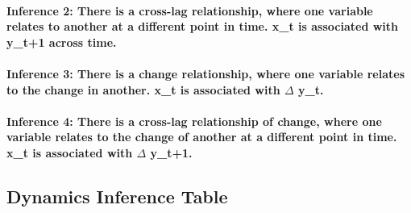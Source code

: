 \documentclass[english,,man]{apa6}
\let\oldparagraph\paragraph
\renewcommand{\paragraph}[1]{\oldparagraph{#1}\mbox{}}
\theoremstyle{definition}
\theoremstyle{definition}
\theoremstyle{definition}
\theoremstyle{remark}
\begin{document}
\hypertarget{inference-2-there-is-a-cross-lag-relationship-where-one-variable-relates-to-another-at-a-different-point-in-time.-x_t-is-associated-with-y_t1-across-time.}{%
\paragraph{Inference 2: There is a cross-lag relationship, where one
variable relates to another at a different point in time. x\_t is
associated with y\_t+1 across
time.}\label{inference-2-there-is-a-cross-lag-relationship-where-one-variable-relates-to-another-at-a-different-point-in-time.-x_t-is-associated-with-y_t1-across-time.}}

\hypertarget{inference-3-there-is-a-change-relationship-where-one-variable-relates-to-the-change-in-another.-x_t-is-associated-with-delta-y_t.}{%
\paragraph{\texorpdfstring{Inference 3: There is a change relationship,
where one variable relates to the change in another. x\_t is associated
with \(\Delta\)
y\_t.}{Inference 3: There is a change relationship, where one variable relates to the change in another. x\_t is associated with \textbackslash{}Delta y\_t.}}\label{inference-3-there-is-a-change-relationship-where-one-variable-relates-to-the-change-in-another.-x_t-is-associated-with-delta-y_t.}}

\hypertarget{inference-4-there-is-a-cross-lag-relationship-of-change-where-one-variable-relates-to-the-change-of-another-at-a-different-point-in-time.-x_t-is-associated-with-delta-y_t1.}{%
\paragraph{\texorpdfstring{Inference 4: There is a cross-lag
relationship of change, where one variable relates to the change of
another at a different point in time. x\_t is associated with \(\Delta\)
y\_t+1.}{Inference 4: There is a cross-lag relationship of change, where one variable relates to the change of another at a different point in time. x\_t is associated with \textbackslash{}Delta y\_t+1.}}\label{inference-4-there-is-a-cross-lag-relationship-of-change-where-one-variable-relates-to-the-change-of-another-at-a-different-point-in-time.-x_t-is-associated-with-delta-y_t1.}}

\hypertarget{dynamics-inference-table}{%
\subsection{Dynamics Inference Table}\label{dynamics-inference-table}}
\end{document}
